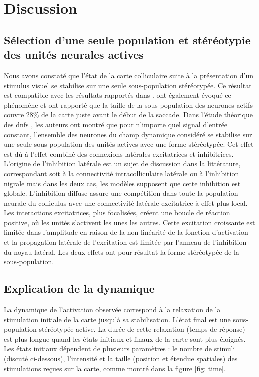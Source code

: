 \section{Discussion}

\subsection{S\'election d'une seule population et stéréotypie des unités neurales actives}

Nous avons constaté que l'état de la carte colliculaire suite à la présentation d'un stimulus visuel se stabilise sur une seule sous-population stéréotypée. Ce résultat est compatible avec les résultats rapportés dans \cite{Anderson:1998}. \cite{Gandhi:2011} ont également évoqué ce phénomène et ont rapporté que la taille de la sous-population des neurones actifs couvre 28\% de la carte juste avant le début de la saccade. Dans l'étude théorique des \glspl{dnf} \cite{Amari:1977}, les auteurs ont montré que pour n'importe quel signal d'entrée constant, l'ensemble des neurones du champ dynamique considéré se stabilise sur une seule sous-population des unités actives avec une forme stéréotypée. Cet effet est dû à l'effet combiné des connexions latérales excitatrices et inhibitrices. \\

L'origine de l'inhibition latérale est un sujet de discussion dans la littérature, correspondant soit à la connectivité intracolliculaire latérale ou à l'inhibition nigrale \cite{Trappenberg:2001} mais dans les deux cas, les modèles supposent que cette inhibition est globale. L'inhibition diffuse assure une compétition dans toute la population neurale du colliculus avec une connectivité latérale excitatrice à effet plus local. Les interactions excitatrices, plus focalisées, créent une boucle de réaction positive, où les unités s'activent les unes les autres. Cette excitation croissante est limitée dans l'amplitude en raison de la non-linéarité de la fonction d'activation et la propagation latérale de l'excitation est limitée par l'anneau de l'inhibition du noyau latéral. Les deux effets ont pour résultat la forme stéréotypée de la sous-population.

\subsection{Explication de la dynamique}

La dynamique de l'activation observée correspond à la relaxation de la stimulation initiale de la carte jusqu'à sa stabilisation. L'état final est une sous-population stéréotypée active. La durée de cette relaxation (temps de réponse) est plus longue quand les états initiaux et finaux de la carte sont plus éloignés. Les états initiaux dépendent de plusieurs paramètres : le nombre de stimuli (discuté ci-dessous), l'intensité et la taille (position et étendue spatiales) des stimulations reçues sur la carte, comme montré dans la figure \ref{fig: time}. \\

